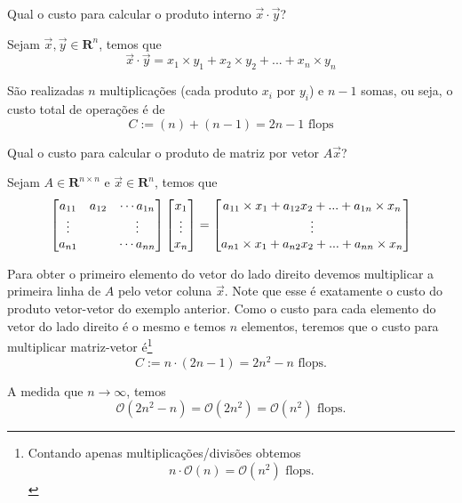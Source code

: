 \begin{ex}
Qual o custo para calcular o produto interno $\vec{x}\cdot\vec{y}$?
\end{ex}
\begin{sol}
Sejam $\vec{x}, \vec{y} \in \mathbf{R}^n$, temos que
\begin{equation}
  \vec{x}\cdot\vec{y} = x_1 \times y_1 + x_2\times y_2 + ... +x_n\times y_n
\end{equation}

São realizadas $n$ multiplicações (cada produto $x_i$ por $y_i$) e $n-1$ somas, ou seja, o custo total de operações é de
\begin{equation}
  C := (n)+(n-1) = 2n-1 \text{~flops}
\end{equation}
\end{sol}


\begin{ex}
Qual o custo para calcular o produto de matriz por vetor $A \vec{x}$?
\end{ex}
\begin{sol}
 Sejam $A \in \mathbf{R}^{n\times n}$ e $\vec{x} \in \mathbf{R}^n$, temos que
\begin{equation}
  \begin{bmatrix} a_{11}&a_{12}&\cdots a_{1n} \\ \vdots&&\vdots \\ a_{n1}&&\cdots a_{nn} \end{bmatrix} \begin{bmatrix} x_1 \\ \vdots \\ x_n \end{bmatrix}
  =\begin{bmatrix}  a_{11}\times x_1 + a_{12}x_2 +...+a_{1n}\times x_n  \\ \vdots \\ a_{n1}\times x_1 + a_{n2}x_2 +...+a_{nn}\times x_n \end{bmatrix} 
\end{equation}

Para obter o primeiro elemento do vetor do lado direito devemos multiplicar a  primeira linha de $A$ pelo vetor coluna $\vec{x}$. Note que esse é exatamente o custo do produto vetor-vetor do exemplo anterior. Como o custo para cada elemento do vetor do lado direito é o mesmo e temos $n$ elementos, teremos que o custo para multiplicar matriz-vetor é\footnote{Contando apenas multiplicações/divisões obtemos
\begin{equation}
  n\cdot \mathcal{O}(n) = \mathcal{O}(n^2) \text{~flops.}
\end{equation}
} 
\begin{equation}
  C:=n \cdot ( 2n-1) = 2n^2-n \text{~flops}.
\end{equation}

A medida que $n \rightarrow \infty$, temos  
\begin{equation}
  \mathcal{O}(2n^2-n) =\mathcal{O}(2n^2)=\mathcal{O}(n^2) \text{~flops.}
\end{equation}

\end{sol}

